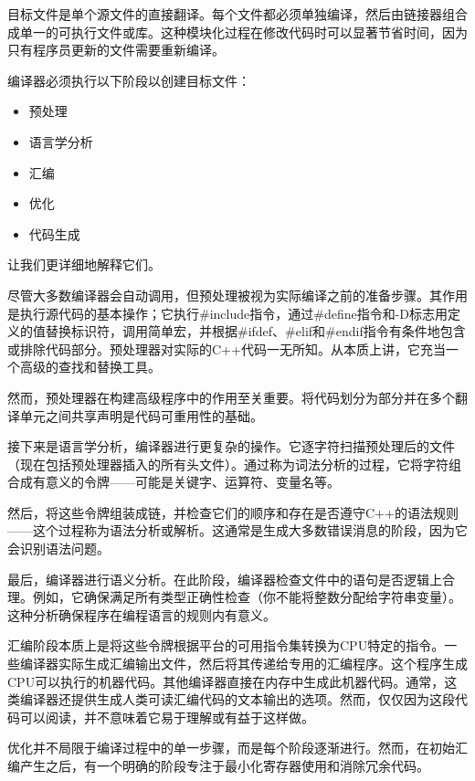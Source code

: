 目标文件是单个源文件的直接翻译。每个文件都必须单独编译，然后由链接器组合成单一的可执行文件或库。这种模块化过程在修改代码时可以显著节省时间，因为只有程序员更新的文件需要重新编译。

编译器必须执行以下阶段以创建目标文件：

\begin{itemize}
\item
预处理

\item
语言学分析

\item
汇编

\item
优化

\item
代码生成
\end{itemize}

让我们更详细地解释它们。

尽管大多数编译器会自动调用，但预处理被视为实际编译之前的准备步骤。其作用是执行源代码的基本操作；它执行\#include指令，通过\#define指令和-D标志用定义的值替换标识符，调用简单宏，并根据\#ifdef、\#elif和\#endif指令有条件地包含或排除代码部分。预处理器对实际的C++代码一无所知。从本质上讲，它充当一个高级的查找和替换工具。

然而，预处理器在构建高级程序中的作用至关重要。将代码划分为部分并在多个翻译单元之间共享声明是代码可重用性的基础。

接下来是语言学分析，编译器进行更复杂的操作。它逐字符扫描预处理后的文件（现在包括预处理器插入的所有头文件）。通过称为词法分析的过程，它将字符组合成有意义的令牌——可能是关键字、运算符、变量名等。

然后，将这些令牌组装成链，并检查它们的顺序和存在是否遵守C++的语法规则——这个过程称为语法分析或解析。这通常是生成大多数错误消息的阶段，因为它会识别语法问题。

最后，编译器进行语义分析。在此阶段，编译器检查文件中的语句是否逻辑上合理。例如，它确保满足所有类型正确性检查（你不能将整数分配给字符串变量）。这种分析确保程序在编程语言的规则内有意义。

汇编阶段本质上是将这些令牌根据平台的可用指令集转换为CPU特定的指令。一些编译器实际生成汇编输出文件，然后将其传递给专用的汇编程序。这个程序生成CPU可以执行的机器代码。其他编译器直接在内存中生成此机器代码。通常，这类编译器还提供生成人类可读汇编代码的文本输出的选项。然而，仅仅因为这段代码可以阅读，并不意味着它易于理解或有益于这样做。

优化并不局限于编译过程中的单一步骤，而是每个阶段逐渐进行。然而，在初始汇编产生之后，有一个明确的阶段专注于最小化寄存器使用和消除冗余代码。

